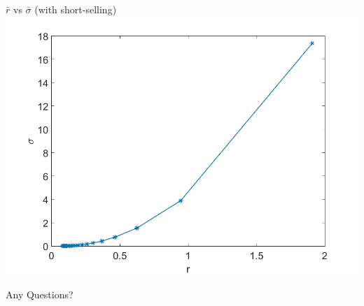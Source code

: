 \documentclass{beamer}
\numberwithin{equation}{section}
\begin{document}
\begin{frame}{$\bar r$ vs $\bar \sigma$ (with short-selling)}
  \centering
  \includegraphics[width=1.0\textwidth]{../plots/r_sigma_alpha_ss}
\end{frame}

\begin{frame}
  \Huge\centering
  Any Questions?
\end{frame}
\end{document}
